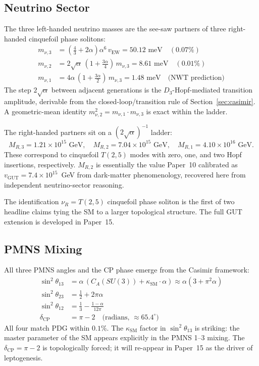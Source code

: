 \documentclass[11pt]{article}
\newcommand{\CA}{C_A}
\newcommand{\ksm}{\kappa_\text{SM}}
\newcommand{\dcp}{\delta_\text{CP}}
\begin{document}
\subsection{Neutrino Sector}

The three left-handed neutrino masses are the see-saw partners of
three right-handed cinquefoil phase solitons:
\begin{align}
  m_{\nu,3} &= \left(\tfrac{4}{3} + 2\alpha\right)\alpha^6\,v_\text{EW}
             = 50.12\text{ meV} \quad (0.07\%)\\
  m_{\nu,2} &= 2\sqrt{\alpha}\,(1 + \tfrac{3\alpha}{4})\,m_{\nu,3}
             = 8.61\text{ meV} \quad (0.01\%) \\
  m_{\nu,1} &= 4\alpha\,(1 + \tfrac{3\alpha}{2})\,m_{\nu,3}
             = 1.48\text{ meV} \quad \text{(NWT prediction)}
\end{align}
The step $2\sqrt{\alpha}$ between adjacent generations is the
$D_3$-Hopf-mediated transition amplitude, derivable from the
closed-loop/transition rule of Section~\ref{sec:casimir}.  A
geometric-mean identity $m_{\nu,2}^2 = m_{\nu,1}\cdot m_{\nu,3}$
is exact within the ladder.

The right-handed partners sit on a $(2\sqrt{\alpha})^{-1}$ ladder:
\begin{equation}
  M_{R,3} = 1.21\times 10^{15}\text{ GeV},\quad
  M_{R,2} = 7.04\times 10^{15}\text{ GeV},\quad
  M_{R,1} = 4.10\times 10^{16}\text{ GeV}.
\end{equation}
These correspond to cinquefoil $T(2,5)$ modes with zero, one, and
two Hopf insertions, respectively.  $M_{R,2}$ is essentially the
value Paper~10 calibrated as $v_\text{GUT} = 7.4\times 10^{15}$~GeV
from dark-matter phenomenology, recovered here from independent
neutrino-sector reasoning.

The identification $\nu_R = T(2,5)$ cinquefoil phase soliton is the
first of two headline claims tying the SM to a larger
topological structure.  The full GUT extension is developed in
Paper~15.

\subsection{PMNS Mixing}

All three PMNS angles and the CP phase emerge from the Casimir
framework:
\begin{align}
  \sin^2\theta_{13} &= \alpha\,(\CA(SU(3)) + \ksm\cdot\alpha)
                     \approx \alpha(3 + \pi^2\alpha) \\
  \sin^2\theta_{23} &= \tfrac{1}{2} + 2\pi\alpha \\
  \sin^2\theta_{12} &= \tfrac{1}{3} - \frac{1-\alpha}{12\pi} \\
  \dcp              &= \pi - 2 \quad\text{(radians, $\approx 65.4^\circ$)}
\end{align}
All four match PDG within $0.1\%$.  The $\ksm$ factor in
$\sin^2\theta_{13}$ is striking: the master parameter of the SM
appears explicitly in the PMNS 1--3 mixing.  The $\dcp = \pi - 2$
is topologically forced; it will re-appear in Paper~15 as the
driver of leptogenesis.
\end{document}
